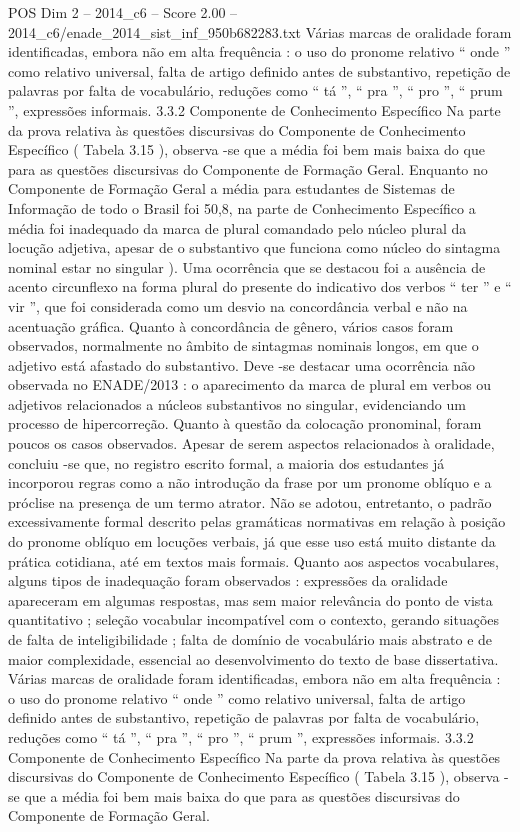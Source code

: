 \begin{textsample}{POS Dim 2 – 2014\_c6 – Score 2.00 – 2014\_c6/enade\_2014\_sist\_inf\_950b682283.txt}
Várias marcas de oralidade foram identificadas, embora não em alta frequência : o uso do pronome relativo “ onde ” como relativo universal, falta de artigo definido antes de substantivo, repetição de palavras por falta de vocabulário, reduções como “ tá ”, “ pra ”, “ pro ”, “ prum ”, expressões informais. 3.3.2 Componente de Conhecimento Específico Na parte da prova relativa às questões discursivas do Componente de Conhecimento Específico ( Tabela 3.15 ), observa -se que a média foi bem mais baixa do que para as questões discursivas do Componente de Formação Geral.
Enquanto no Componente de Formação Geral a média para estudantes de Sistemas de Informação de todo o Brasil foi 50,8, na parte de Conhecimento Específico a média foi inadequado da marca de plural comandado pelo núcleo plural da locução adjetiva, apesar de o substantivo que funciona como núcleo do sintagma nominal estar no singular ).
Uma ocorrência que se destacou foi a ausência de acento circunflexo na forma plural do presente do indicativo dos verbos “ ter ” e “ vir ”, que foi considerada como um desvio na concordância verbal e não na acentuação gráfica.
Quanto à concordância de gênero, vários casos foram observados, normalmente no âmbito de sintagmas nominais longos, em que o adjetivo está afastado do substantivo.
Deve -se destacar uma ocorrência não observada no ENADE/2013 : o aparecimento da marca de plural em verbos ou adjetivos relacionados a núcleos substantivos no singular, evidenciando um processo de hipercorreção.
Quanto à questão da colocação pronominal, foram poucos os casos observados.
Apesar de serem aspectos relacionados à oralidade, concluiu -se que, no registro escrito formal, a maioria dos estudantes já incorporou regras como a não introdução da frase por um pronome oblíquo e a próclise na presença de um termo atrator.
Não se adotou, entretanto, o padrão excessivamente formal descrito pelas gramáticas normativas em relação à posição do pronome oblíquo em locuções verbais, já que esse uso está muito distante da prática cotidiana, até em textos mais formais.
Quanto aos aspectos vocabulares, alguns tipos de inadequação foram observados : expressões da oralidade apareceram em algumas respostas, mas sem maior relevância do ponto de vista quantitativo ; seleção vocabular incompatível com o contexto, gerando situações de falta de inteligibilidade ; falta de domínio de vocabulário mais abstrato e de maior complexidade, essencial ao desenvolvimento do texto de base dissertativa.
Várias marcas de oralidade foram identificadas, embora não em alta frequência : o uso do pronome relativo “ onde ” como relativo universal, falta de artigo definido antes de substantivo, repetição de palavras por falta de vocabulário, reduções como “ tá ”, “ pra ”, “ pro ”, “ prum ”, expressões informais. 3.3.2 Componente de Conhecimento Específico Na parte da prova relativa às questões discursivas do Componente de Conhecimento Específico ( Tabela 3.15 ), observa -se que a média foi bem mais baixa do que para as questões discursivas do Componente de Formação Geral.

\end{textsample}
